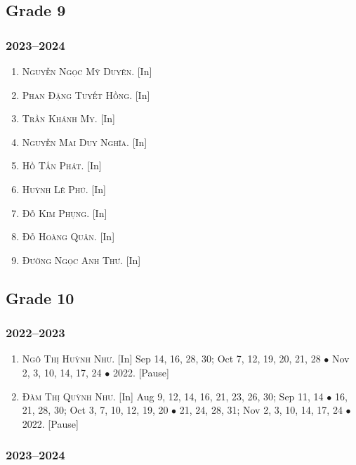 \documentclass{article}
\begin{document}
\subsection{Grade 9}

\subsubsection{2023--2024}

\begin{enumerate}
	\item \textsc{Nguyễn Ngọc Mỹ Duyên.} \textsf{[In]} 
	\item \textsc{Phan Đặng Tuyết Hồng.} \textsf{[In]} 
	\item \textsc{Trần Khánh My.} \textsf{[In]} 
	\item \textsc{Nguyễn Mai Duy Nghĩa.} \textsf{[In]} 
	\item \textsc{Hồ Tấn Phát.} \textsf{[In]} 
	\item \textsc{Huỳnh Lê Phú.} \textsf{[In]} 
	\item \textsc{Đỗ Kim Phụng.} \textsf{[In]} 
	\item \textsc{Đỗ Hoàng Quân.} \textsf{[In]} 
	\item \textsc{Đường Ngọc Anh Thư.} \textsf{[In]} 
\end{enumerate}

\subsection{Grade 10}

\subsubsection{2022--2023}

\begin{enumerate}
	\item \textsc{Ngô Thị Huỳnh Như.} \textsf{[In]} Sep 14, 16, 28, 30; Oct 7, 12, 19, 20, 21, 28 $\bullet$ Nov 2, 3, 10, 14, 17, 24 $\bullet$ 2022. \textsf{[Pause]}
	\item \textsc{Đàm Thị Quỳnh Như.} \textsf{[In]} Aug 9, 12, 14, 16, 21, 23, 26, 30; Sep 11, 14 $\bullet$ 16, 21, 28, 30; Oct 3, 7, 10, 12, 19, 20 $\bullet$ 21, 24, 28, 31; Nov 2, 3, 10, 14, 17, 24 $\bullet$ 2022. \textsf{[Pause]}
\end{enumerate}

\subsubsection{2023--2024}
\end{document}
